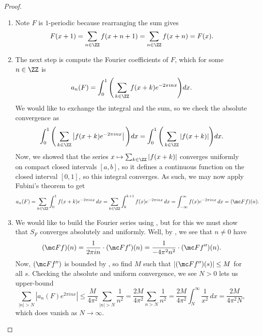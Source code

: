 \documentclass[../notes.tex]{subfiles}
\begin{document}
\begin{proof}
\begin{enumerate}
		\item Note $F$ is $1$-periodic because rearranging the sum gives
		\[F(x+1)=\sum_{n\in\ZZ}f(x+n+1)=\sum_{n\in\ZZ}f(x+n)=F(x).\]

		\item The next step is compute the Fourier coefficients of $F$, which for some $n\in\ZZ$ is
		\[a_n(F)=\int_0^1\Bigg(\sum_{k\in\ZZ}f(x+k)e^{-2\pi inx}\Bigg)dx.\]
		We would like to exchange the integral and the sum, so we check the absolute convergence as
		\[\int_0^1\Bigg(\sum_{k\in\ZZ}\left|f(x+k)e^{-2\pi inx}\right|\Bigg)dx=\int_0^1\Bigg(\sum_{k\in\ZZ}|f(x+k)|\Bigg)dx.\]
		Now, we showed that the series $x\mapsto\sum_{k\in\ZZ}|f(x+k)|$ converges uniformly on compact closed intervals $[a,b]$, so it defines a continuous function on the closed interval $[0,1]$, so this integral converges. As such, we may now apply Fubini's theorem to get
		\[a_n(F)=\sum_{k\in\ZZ}\int_0^1f(x+k)e^{-2\pi inx}\,dx=\sum_{k\in\ZZ}\int_k^{k+1}f(x)e^{-2\pi inx}\,dx=\int_{-\infty}^\infty f(x)e^{-2\pi inx}\,dx=(\mc Ff)(n).\]

		\item We would like to build the Fourier series using , but for this we must show that $S_F$ converges absolutely and uniformly. Well, by , we see that $n\ne0$ have
		\[(\mc Ff)(n)=\frac1{2\pi in}\cdot(\mc Ff')(n)=\frac1{-4\pi^2n^2}\cdot(\mc Ff'')(n).\]
		Now, $(\mc Ff'')$ is bounded by , so find $M$ such that $|(\mc Ff'')(s)|\le M$ for all $s$. Checking the absolute and uniform convergence, we see $N>0$ lets us upper-bound
		\[\sum_{|n|>N}\left|a_n(F)e^{2\pi inx}\right|\le\frac M{4\pi^2}\sum_{|n|>N}\frac1{n^2}=\frac{2M}{4\pi^2}\sum_{n>N}\frac1{n^2}=\frac{2M}{4\pi^2}\int_N^\infty\frac1{x^2}\,dx=\frac{2M}{4\pi^2N},\]
		which does vanish as $N\to\infty$.


\end{enumerate}
\end{proof}
\end{document}
